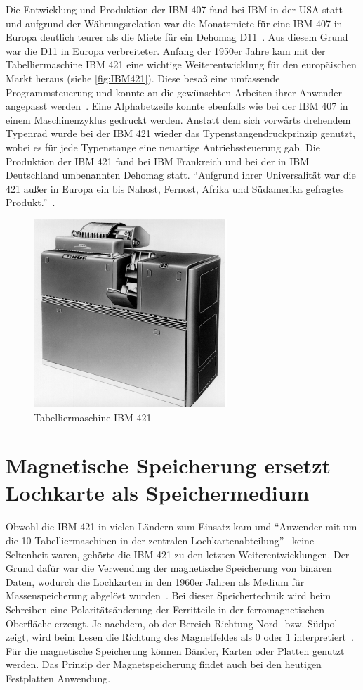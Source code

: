 \documentclass[parskip=half]{scrartcl}
\begin{document}
Die Entwicklung und Produktion der IBM 407 fand bei IBM in der USA statt und
aufgrund der Währungsrelation war die Monatsmiete für eine IBM 407 in Europa
deutlich teurer als die Miete für ein Dehomag D11~\cite{sandner}. Aus diesem
Grund war die D11 in Europa verbreiteter. Anfang der 1950er Jahre kam mit der
Tabelliermaschine IBM 421 eine wichtige Weiterentwicklung für den europäischen
Markt heraus (siehe \autoref{fig:IBM421}). Diese besaß eine umfassende
Programmsteuerung und konnte an die gewünschten Arbeiten ihrer Anwender
angepasst werden~\cite{deutschesMuseum}. Eine Alphabetzeile konnte ebenfalls
wie bei der IBM 407 in einem Maschinenzyklus gedruckt werden. Anstatt dem sich
vorwärts drehendem Typenrad wurde bei der IBM 421 wieder das
Typenstangendruckprinzip genutzt, wobei es für jede Typenstange eine neuartige
Antriebssteuerung gab. Die Produktion der IBM 421 fand bei IBM Frankreich und
bei der in IBM Deutschland umbenannten Dehomag statt. \enquote{Aufgrund ihrer
Universalität war die 421 außer in Europa ein bis Nahost, Fernost, Afrika und
Südamerika gefragtes Produkt.}~\cite{sandner}.

\begin{figure}[h]
  \centering
  \includegraphics{IBM421}
  \caption{Tabelliermaschine IBM 421~\cite{sandner}}
  \label{fig:IBM421}
\end{figure}

\section{Magnetische Speicherung ersetzt Lochkarte als Speichermedium}

Obwohl die IBM 421 in vielen Ländern zum Einsatz kam und \enquote{Anwender mit
um die 10 Tabelliermaschinen in der zentralen
Lochkartenabteilung}~\cite{sandner} keine Seltenheit waren, gehörte die IBM 421
zu den letzten Weiterentwicklungen. Der Grund dafür war die Verwendung der
magnetische Speicherung von binären Daten, wodurch die Lochkarten in den 1960er
Jahren als Medium für Massenspeicherung abgelöst wurden~\cite{gronau2009}. Bei
dieser Speichertechnik wird beim Schreiben eine Polaritätsänderung der
Ferritteile in der  ferromagnetischen Oberfläche erzeugt. Je nachdem, ob der
Bereich Richtung Nord- bzw. Südpol zeigt, wird beim Lesen die Richtung des
Magnetfeldes als 0 oder 1 interpretiert~\cite{gronau2009}. Für die magnetische
Speicherung können Bänder, Karten oder Platten genutzt werden. Das Prinzip der
Magnetspeicherung findet auch bei den heutigen Festplatten Anwendung.
\end{document}
